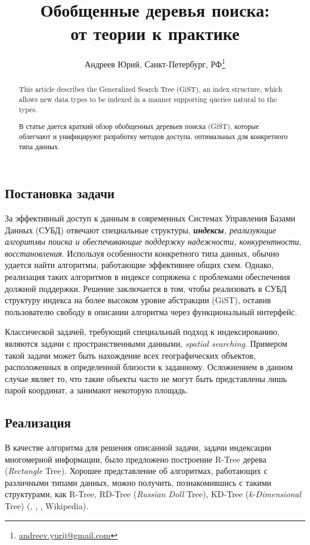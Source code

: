 \documentclass[10pt, a5paper]{article}
\begin{document}
\title{Обобщенные деревья поиска: \\[2mm] от теории к практике}
\author{Андреев Юрий, Санкт-Петербург, РФ\footnote{\url{andreev.yurij@gmail.com}}}
\maketitle
\begin{abstract}

This article describes the Generalized Search Tree (GiST), an index structure, 
which allows new data types to be indexed in a manner supporting queries natural to the types.

В статье дается краткий обзор обобщенных деревьев поиска (GiST),
которые облегчают и унифицируют разработку методов доступа, оптимальных для конкретного типа данных.
\end{abstract}

\subsection*{Постановка задачи}
За эффективный доступ к данным в современных Системах Управления Базами Данных (СУБД) 
отвечают специальные структуры, \textit{\textbf{индексы}, реализующие алгоритмы поиска
и обеспечивающие поддержку надежности, конкурентности, восстановления}.
Используя особенности конкретного типа данных, обычно удается найти алгоритмы,
работающие эффективнее общих схем.
Однако, реализация таких алгоритмов в индексе сопряжена с проблемами обеспечения должной поддержки.
Решение заключается в том, чтобы реализовать в СУБД структуру индекса на более высоком уровне абстракции (GiST),
оставив пользователю свободу в описании алгоритма через функциональный интерфейс. 

Классической задачей, требующий специальный подход к индексированию, являются
задачи с пространственными данными, \textit{spatial searching}. Примером такой задачи
может быть нахождение всех географических объектов, расположенных в определенной близости к заданному.
Осложнением в данном случае являет то, что такие объекты часто не могут быть представлены лишь парой координат,
а занимают некоторую площадь.  

\subsection*{Реализация}
В качестве алгоритма для решения описанной задачи, задачи индексации многомерной информации, 
было предложено построение R-Tree дерева (\textit{Rectangle} Tree).
Хорошее представление об алгоритмах, работающих с различными типами данных, можно получить,
познакомившись с такими структурами, как R-Tree, RD-Tree (\textit{Russian Doll} Tree), KD-Tree (\textit{k-Dimensional} Tree) 
(\cite{DB}, \cite{R-Tree}, \cite{RD-Tree}, Wikipedia).
\end{document}
